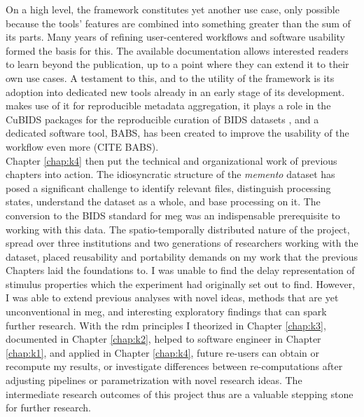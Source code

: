 On a high level, the framework constitutes yet another use case, only possible because the tools' features are combined into something greater than the sum of its parts.
Many years of refining user-centered workflows and software usability formed the basis for this.
The available documentation allows interested readers to learn beyond the publication, up to a point where they can extend it to their own use cases.
A testament to this, and to the utility of the framework is its adoption into dedicated new tools already in an early stage of its development.
\citet{heunis2023catalog} makes use of it for reproducible metadata aggregation, it plays a role in the CuBIDS packages for the reproducible curation of \gls{BIDS} datasets \citep{covitz2022curation}, and a dedicated software tool, BABS, has been created to improve the usability of the workflow even more (CITE BABS).\\
Chapter \ref{chap:k4} then put the technical and organizational work of previous chapters into action.
The idiosyncratic structure of the \textit{memento} dataset has posed a significant challenge to identify relevant files, distinguish processing states, understand the dataset as a whole, and base processing on it.
The conversion to the \gls{BIDS} standard for \gls{meg} was an indispensable prerequisite to working with this data.
The spatio-temporally distributed nature of the project, spread over three institutions and two generations of researchers working with the dataset, placed reusability and portability demands on my work that the previous Chapters laid the foundations to.
I was unable to find the delay representation of stimulus properties which the experiment had originally set out to find.
However, I was able to extend previous analyses with novel ideas, methods that are yet unconventional in \gls{meg}, and interesting exploratory findings that can spark further research.
With the \gls{rdm} principles I theorized in Chapter \ref{chap:k3}, documented in Chapter \ref{chap:k2}, helped to software engineer in Chapter \ref{chap:k1}, and applied in Chapter \ref{chap:k4}, future re-users can obtain or recompute my results, or investigate differences between re-computations after adjusting pipelines or parametrization with novel research ideas.
The intermediate research outcomes of this project thus are a valuable stepping stone for further research.











